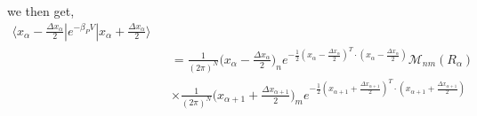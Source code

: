 we then get, 
\begin{eqnarray}
\langle  x_{\alpha}- \frac{\Delta x_{\alpha}}{2}| e^{-\beta_P V}|x_{\alpha}+ \frac{\Delta x_{\alpha}}{2}\rangle
\\
\nonumber
&&=
\frac{1}{(2\pi)^{N}}\bigg(x_{\alpha}- \frac{\Delta x_{\alpha}}{2}\bigg)_n e^{-\frac{1}{2} (x_{\alpha}- \frac{\Delta x_{\alpha}}{2})^T\cdot (x_{\alpha}- \frac{\Delta x_{\alpha}}{2})} \mathcal{M}_{nm} (R_{\alpha})
\\
\nonumber
&&
\times \frac{1}{(2\pi)^{N}}\bigg(x_{\alpha+1}+ \frac{\Delta x_{\alpha+1}}{2}\bigg)_m e^{-\frac{1}{2} (x_{\alpha+1}+ \frac{\Delta x_{\alpha+1}}{2})^T\cdot (x_{\alpha+1}+ \frac{\Delta x_{\alpha+1}}{2})}
\end{eqnarray}

